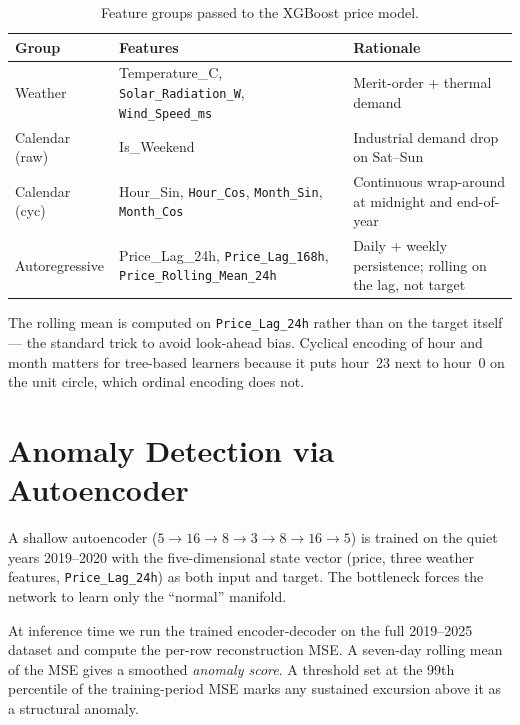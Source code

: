 \documentclass[11pt,a4paper]{article}
\newcommand{\code}[1]{\allowbreak\texttt{\small #1}\allowbreak}
\begin{document}
\begin{table}[h]
\centering
\small
\begin{tabular}{@{}>{\raggedright\arraybackslash}p{3cm}>{\raggedright\arraybackslash}p{6cm}>{\raggedright\arraybackslash}p{6cm}@{}}
\toprule
\textbf{Group} & \textbf{Features} & \textbf{Rationale} \\
\midrule
Weather & Temperature\_C, \code{Solar\_Radiation\_W}, \code{Wind\_Speed\_ms}
              & Merit-order + thermal demand \\
Calendar (raw)& {Is\_Weekend} & Industrial demand drop on Sat--Sun \\
Calendar (cyc)& {Hour\_Sin}, \code{Hour\_Cos}, \code{Month\_Sin}, \code{Month\_Cos}
              & Continuous wrap-around at midnight and end-of-year \\
Autoregressive & {Price\_Lag\_24h}, \code{Price\_Lag\_168h}, \code{Price\_Rolling\_Mean\_24h}
              & Daily + weekly persistence; rolling on the lag, not target \\
\bottomrule
\end{tabular}
\caption{Feature groups passed to the XGBoost price model.}
\label{tab:features}
\end{table}

The rolling mean is computed on \code{Price\_Lag\_24h} rather than on
the target itself --- the standard trick to avoid look-ahead bias.
Cyclical encoding of hour and month matters for tree-based learners
because it puts hour~23 next to hour~0 on the unit circle, which ordinal
encoding does not.


\section{Anomaly Detection via Autoencoder}

A shallow autoencoder ($5\!\to\!16\!\to\!8\!\to\!3\!\to\!8\!\to\!16\!\to\!5$)
is trained on the quiet years 2019--2020 with the five-dimensional
state vector (price, three weather features, \code{Price\_Lag\_24h}) as
both input and target. The bottleneck forces the network to learn only
the ``normal'' manifold.

At inference time we run the trained encoder-decoder on the full
2019--2025 dataset and compute the per-row reconstruction MSE. A
seven-day rolling mean of the MSE gives a smoothed \emph{anomaly score}.
A threshold set at the 99th percentile of the training-period MSE marks
any sustained excursion above it as a structural anomaly.
\end{document}
